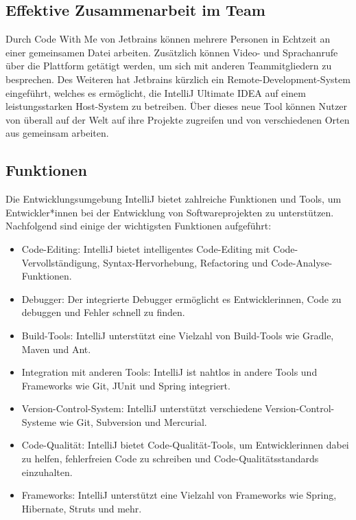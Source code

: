 \subsection{Effektive Zusammenarbeit im Team}
Durch Code With Me von Jetbrains können mehrere Personen in Echtzeit an einer gemeinsamen Datei arbeiten. Zusätzlich können Video- und Sprachanrufe über die Plattform getätigt werden, um sich mit anderen Teammitgliedern zu besprechen. Des Weiteren hat Jetbrains kürzlich ein Remote-Development-System eingeführt, welches es ermöglicht, die IntelliJ Ultimate IDEA auf einem leistungsstarken Host-System zu betreiben. Über dieses neue Tool können Nutzer von überall auf der Welt auf ihre Projekte zugreifen und von verschiedenen Orten aus gemeinsam arbeiten.

\subsection{Funktionen}

Die Entwicklungsumgebung IntelliJ bietet zahlreiche Funktionen und Tools, um Entwickler*innen bei der Entwicklung von Softwareprojekten zu unterstützen. Nachfolgend sind einige der wichtigsten Funktionen aufgeführt:

\begin{itemize}
\item Code-Editing: IntelliJ bietet intelligentes Code-Editing mit Code-Vervollständigung, Syntax-Hervorhebung, Refactoring und Code-Analyse-Funktionen.
\item Debugger: Der integrierte Debugger ermöglicht es Entwicklerinnen, Code zu debuggen und Fehler schnell zu finden.
\item Build-Tools: IntelliJ unterstützt eine Vielzahl von Build-Tools wie Gradle, Maven und Ant.
\item Integration mit anderen Tools: IntelliJ ist nahtlos in andere Tools und Frameworks wie Git, JUnit und Spring integriert.
\item Version-Control-System: IntelliJ unterstützt verschiedene Version-Control-Systeme wie Git, Subversion und Mercurial.
\item Code-Qualität: IntelliJ bietet Code-Qualität-Tools, um Entwicklerinnen dabei zu helfen, fehlerfreien Code zu schreiben und Code-Qualitätsstandards einzuhalten.
\item Frameworks: IntelliJ unterstützt eine Vielzahl von Frameworks wie Spring, Hibernate, Struts und mehr.
\end{itemize}
\newpage

